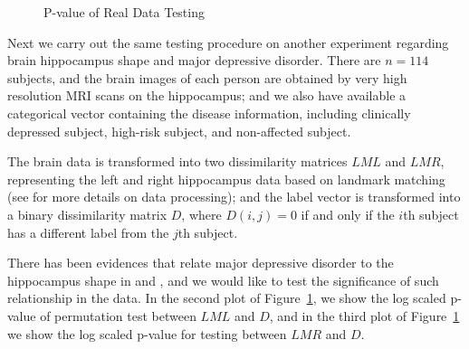 \documentclass[12pt]{article}
\begin{document}
\begin{figure}[htbp]
\centering
{}
\hfil
\centering
{}
\hfil
\centering
{}
\caption{P-value of Real Data Testing}
\label{figReal}
\end{figure}

Next we carry out the same testing procedure on another experiment regarding brain hippocampus shape and major depressive disorder. There are $n=114$ subjects, and the brain images of each person are obtained by very high resolution MRI scans on the hippocampus; and we also have available a categorical vector containing the disease information, including clinically depressed subject, high-risk subject, and non-affected subject. 

The brain data is transformed into two dissimilarity matrices $LML$ and $LMR$, representing the left and right hippocampus data based on landmark matching (see \cite{ParkEtAl2011} for more details on data processing); and the label vector is transformed into a binary dissimilarity matrix $D$, where $D(i,j)=0$ if and only if the $i$th subject has a different label from the $j$th subject.

There has been evidences that relate major depressive disorder to the hippocampus shape in \cite{ParkEtAl2011} and \cite{PosenerEtAl2003}, and we would like to test the significance of such relationship in the data. In the second plot of Figure~\ref{figReal}, we show the log scaled p-value of permutation test between $LML$ and $D$, and in the third plot of Figure~\ref{figReal} we show the log scaled p-value for testing between $LMR$ and $D$. 
\end{document}
